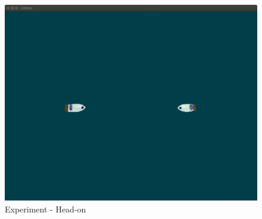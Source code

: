     \begin{figure}[H] 
        \centering
        \includegraphics[scale=0.2]{figs/Experiment_HeadOn_1}
        \caption{Experiment - Head-on}
        \label{fig:Experiments_HeadOn_InitialState}
    \end{figure}
    
